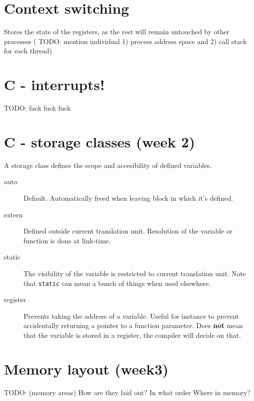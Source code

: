 \documentclass{article}
\begin{document}
\section*{Context switching}
Stores the state of the registers, as the rest will remain untouched by other processes (
TODO: mention individual 1) process address space and 2) call stack for each thread)


\section*{C - interrupts!}
TODO: fuck fuck fuck


\section*{C - storage classes (week 2)}
A storage class defines the scope and accesibility of defined variables.
\begin{description}
\item[auto] Default. Automatically freed when leaving block in which it's defined.
\item[extern] Defined outside current translation unit. Resolution of the variable or function is done at link-time.
\item[static] The visibility of the variable is restricted to current translation unit. Note that \texttt{static} can mean a bunch of things when used elsewhere.
\item[register] Prevents taking the address of a variable. Useful for instance to prevent accidentally returning a pointer to a function parameter. Does \textbf{not} mean that the variable is stored in a register, the compiler will decide on that.
\end{description}


\section*{Memory layout (week3)}
TODO: (memory areas) How are they laid out? In what order Where in memory?
\end{document}
